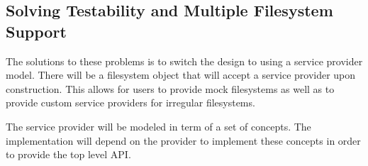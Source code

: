 \documentclass{acm_proc_article-sp}
\begin{document}
    \subsection {Solving Testability and Multiple Filesystem Support}
    The solutions to these problems is to switch the design to using a service
    provider model. There will be a filesystem object that will accept a service
    provider upon construction. This allows for users to provide mock filesystems
    as well as to provide custom service providers for irregular filesystems.

    The service provider will be modeled in term of a set of concepts. The 
    implementation will depend on the provider to implement these concepts in 
    order to provide the top level API.
\end{document}
